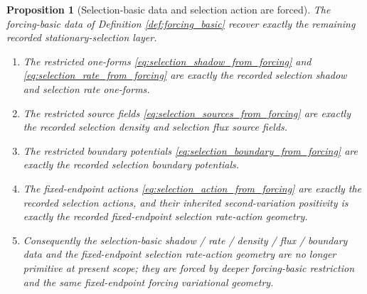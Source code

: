 \documentclass[11pt]{article}
\newtheorem{proposition}{Proposition}
\begin{document}
\begin{proposition}[Selection-basic data and selection action are forced]
\label{prop:selection_basic_forced}
The forcing-basic data of Definition \ref{def:forcing_basic} recover exactly the remaining recorded stationary-selection layer.
\begin{enumerate}
    \item The restricted one-forms \eqref{eq:selection_shadow_from_forcing} and \eqref{eq:selection_rate_from_forcing} are exactly the recorded selection shadow and selection rate one-forms.
    \item The restricted source fields \eqref{eq:selection_sources_from_forcing} are exactly the recorded selection density and selection flux source fields.
    \item The restricted boundary potentials \eqref{eq:selection_boundary_from_forcing} are exactly the recorded selection boundary potentials.
    \item The fixed-endpoint actions \eqref{eq:selection_action_from_forcing} are exactly the recorded selection actions, and their inherited second-variation positivity is exactly the recorded fixed-endpoint selection rate-action geometry.
    \item Consequently the selection-basic shadow / rate / density / flux / boundary data and the fixed-endpoint selection rate-action geometry are no longer primitive at present scope; they are forced by deeper forcing-basic restriction and the same fixed-endpoint forcing variational geometry.
\end{enumerate}
\end{proposition}
\end{document}
